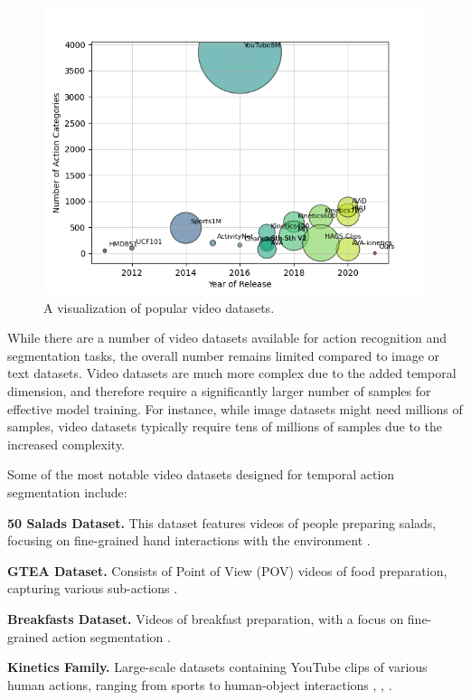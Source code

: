 \begin{figure}[h!]
    \centering
    \includegraphics[width=1\linewidth]{../../assets/figures/popular-datasets.png}
    \caption{A visualization of popular video datasets.}
    \label{fig:your-label}
\end{figure}

While there are a number of video datasets available for action recognition and segmentation tasks, the overall number remains limited compared to image or text datasets. Video datasets are much more complex due to the added temporal dimension, and therefore require a significantly larger number of samples for effective model training. For instance, while image datasets might need millions of samples, video datasets typically require tens of millions of samples due to the increased complexity.

Some of the most notable video datasets designed for temporal action segmentation include:

\noindent\textbf{50 Salads Dataset.} This dataset features videos of people preparing salads, focusing on fine-grained hand interactions with the environment \cite{50salads-dataset}.

\noindent\textbf{GTEA Dataset.} Consists of Point of View (POV) videos of food preparation, capturing various sub-actions \cite{gtea-dataset}.

\noindent\textbf{Breakfasts Dataset.} Videos of breakfast preparation, with a focus on fine-grained action segmentation \cite{breakfast-dataset}.

\noindent\textbf{Kinetics Family.} Large-scale datasets containing YouTube clips of various human actions, ranging from sports to human-object interactions \cite{kinetics-400-dataset}, \cite{kinetics-600-dataset}, \cite{kinetics-700-dataset}.

